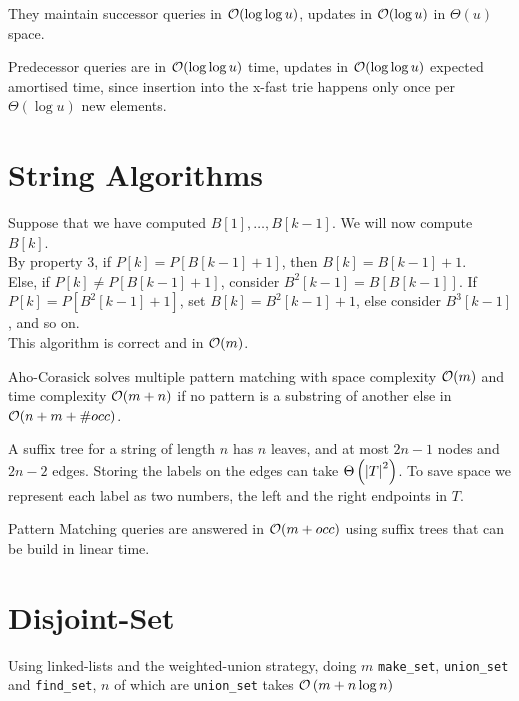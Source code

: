 \documentclass[10pt]{cours}
\begin{document}
\begin{proposition}
    They maintain successor queries in $\mathcal{O}(\log \log u)$, updates in $\mathcal{O}(\log u)$ in $\Theta(u)$ space.
\end{proposition}
\begin{proposition}
    Predecessor queries are in $\mathcal{O}(\log \log u)$ time, updates in $\mathcal{O}(\log \log u)$ expected amortised time, since insertion into the x-fast trie happens only once per $\Theta(\log u)$ new elements.
\end{proposition}

\section{String Algorithms}
\begin{proposition}[KMP]
    Suppose that we have computed $B[1], \ldots, B[k - 1]$. We will now compute $B[k]$.\\
    By property 3, if $P[k] = P[B[k - 1] + 1]$, then $B[k] = B[k - 1] + 1$.\\
    Else, if $P[k] \neq P[B[k - 1] + 1]$, consider $B^{2}[k - 1] = B[B[k - 1]]$. If $P[k] = P[B^{2}[k - 1] + 1]$, set $B[k] = B^{2}[k - 1] + 1$, else consider $B^{3}[k - 1]$, and so on.\\

    This algorithm is correct and in $\mathcal{O}(m)$.
\end{proposition}

\begin{proposition}
    Aho-Corasick solves multiple pattern matching with space complexity $\mathcal{O}(m)$ and time complexity $\mathcal{O}(m + n)$ if no pattern is a substring of another else in $\mathcal{O}(n + m + \#occ)$.
\end{proposition}
\begin{proposition}
    A suffix tree for a string of length $n$ has $n$ leaves, and at most $2n - 1$ nodes and $2n - 2$ edges. Storing the labels on the edges can take $\Theta\left(\left|T\right|^{2}\right)$. To save space we represent each label as two numbers, the left and the right endpoints in $T$.
\end{proposition}

\begin{theorem}
    Pattern Matching queries are answered in $\mathcal{O}(m + occ)$ using suffix trees that can be build in linear time.
\end{theorem}

\section{Disjoint-Set}
\begin{theorem}
    Using linked-lists and the weighted-union strategy, doing $m$ \texttt{make\_set}, \texttt{union\_set} and \texttt{find\_set}, $n$ of which are \texttt{union\_set} takes $\mathcal{O}\left(m + n\log n\right)$
\end{theorem}
\end{document}
